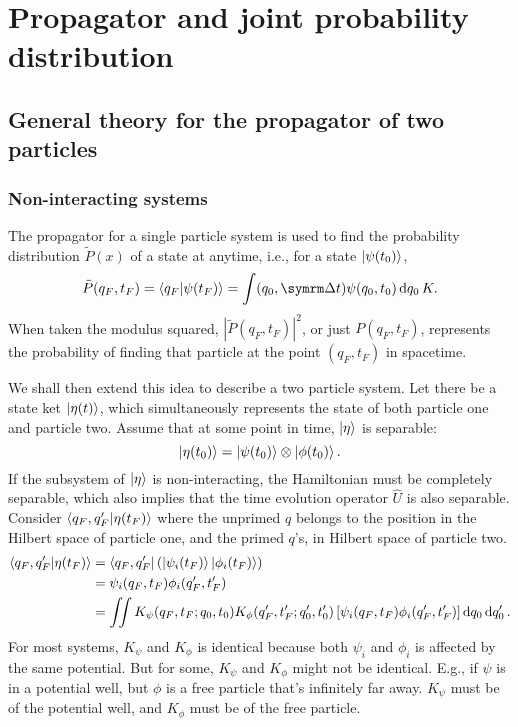 \chapter{Propagator and joint probability distribution}

\section{General theory for the propagator of two particles}

\subsection{Non-interacting systems}

The propagator for a single particle system is used to find the probability distribution $\tilde{P}(x)$ of a state at anytime, i.e., for a state $\ket{\psi(t_0)}$,
\begin{equation}
    \tilde{P}(q_F, t_F) = \braket{q_F}{\psi(t_F)} = \int(q_0, \Dd{t})\psi(q_0, t_0)\dd{q_0}K.
\end{equation}
When taken the modulus squared, $|\tilde{P}(q_F, t_F)|^2$, or just $P(q_F, t_F)$, represents the probability of finding that particle at the point $(q_F, t_F)$ in spacetime.

We shall then extend this idea to describe a two particle system. Let there be a state ket $\ket{\eta(t)}$, which simultaneously represents the state of both particle one and particle two. Assume that at some point in time, $\ket{\eta}$ is separable:
\begin{equation}
    \ket{\eta(t_0)} = \ket{\psi(t_0)} \otimes \ket{\phi(t_0)}.
\end{equation}
If the subsystem of $\ket{\eta}$ is non-interacting, the Hamiltonian must be completely separable, which also implies that the time evolution operator $\hat{U}$ is also separable. Consider $\braket{q_F, q_F'}{\eta(t_F)}$ where the unprimed $q$ belongs to the position in the Hilbert space of particle one, and the primed $q$'s, in Hilbert space of particle two.
\begin{align*}
    \braket{q_F, q_F'}{\eta(t_F)} &= \bra{q_F, q_F'}\left(\ket{\psi_i(t_F)}\ket{\phi_i(t_F)}\right) \\
    &= \psi_i(q_F, t_F)\phi_i(q_F', t_F') \\
    &= \iint K_{\psi}(q_F, t_F; q_0, t_0)K_{\phi}(q_F', t_F'; q_0', t_0')\left[\psi_i(q_F, t_F)\phi_i(q_F', t_F')\right] \dd{q_0}\dd{q_0'}.
\end{align*}
For most systems, $K_{\psi}$ and $K_{\phi}$ is identical because both $\psi_i$ and $\phi_i$ is affected by the same potential. But for some, $K_{\psi}$ and $K_{\phi}$ might not be identical. E.g., if $\psi$ is in a potential well, but $\phi$ is a free particle that's infinitely far away. $K_{\psi}$ must be of the potential well, and $K_{\phi}$ must be of the free particle.

